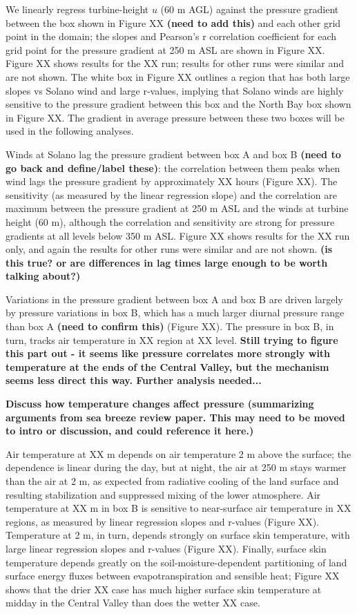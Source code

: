 \documentclass[12pt]{amsart}
\begin{document}
We linearly regress turbine-height $u$ (60 m AGL) against the pressure gradient between the box shown in Figure XX \textbf{(need to add this)} and each other grid point in the domain; the slopes and Pearson's r correlation coefficient for each grid point for the pressure gradient at 250 m ASL are shown in Figure XX.  Figure XX shows results for the XX run; results for other runs were similar and are not shown.  The white box in Figure XX outlines a region that has both large slopes vs Solano wind and large r-values, implying that Solano winds are highly sensitive to the pressure gradient between this box and the North Bay box shown in Figure XX.  The gradient in average pressure between these two boxes will be used in the following analyses.

Winds at Solano lag the pressure gradient between box A and box B \textbf{(need to go back and define/label these)}: the correlation between them peaks when wind lags the pressure gradient by approximately XX hours (Figure XX).  The sensitivity (as measured by the linear regression slope) and the correlation are maximum between the pressure gradient at 250 m ASL and the winds at turbine height (60 m), although the correlation and sensitivity are strong for pressure gradients at all levels below 350 m ASL.  Figure XX shows results for the XX run only, and again the results for other runs were similar and are not shown.  \textbf{(is this true?  or are differences in lag times large enough to be worth talking about?)}

Variations in the pressure gradient between box A and box B are driven largely by pressure variations in box B, which has a much larger diurnal pressure range than box A \textbf{(need to confirm this)} (Figure XX).  The pressure in box B, in turn, tracks air temperature in XX region at XX level.  \textbf{Still trying to figure this part out - it seems like pressure correlates more strongly with temperature at the ends of the Central Valley, but the mechanism seems less direct this way.  Further analysis needed...}

\textbf{Discuss how temperature changes affect pressure (summarizing arguments from sea breeze review paper.  This may need to be moved to intro or discussion, and could reference it here.)}

Air temperature at XX m depends on air temperature 2 m above the surface; the dependence is linear during the day, but at night, the air at 250 m stays warmer than the air at 2 m, as expected from radiative cooling of the land surface and resulting stabilization and suppressed mixing of the lower atmosphere.  Air temperature at XX m in box B is sensitive to near-surface air temperature in XX regions, as measured by linear regression slopes and r-values (Figure XX).  Temperature at 2 m, in turn, depends strongly on surface skin temperature, with large linear regression slopes and r-values (Figure XX).  Finally, surface skin temperature depends greatly on the soil-moisture-dependent partitioning of land surface energy fluxes between evapotranspiration and sensible heat; Figure XX shows that the drier XX case has much higher surface skin temperature at midday in the Central Valley than does the wetter XX case.
\end{document}
